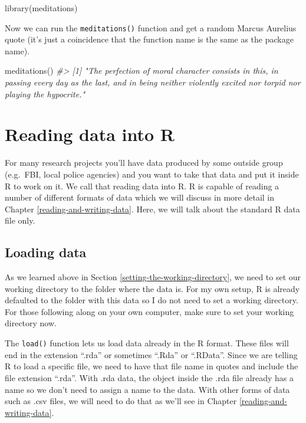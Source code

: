 \documentclass[
]{krantz}
\makeatletter
\newenvironment{Shaded}{\begin{snugshade}}{\end{snugshade}}
\newcommand{\CommentTok}[1]{\textcolor[rgb]{0.37,0.37,0.37}{\textit{#1}}}
\newcommand{\FunctionTok}[1]{\textcolor[rgb]{0,0,0}{#1}}
\newcommand{\NormalTok}[1]{#1}
\newenvironment{kframe}{%
\medskip{}
\setlength{\fboxsep}{.8em}
 \def\at@end@of@kframe{}%
 \ifinner\ifhmode%
  \def\at@end@of@kframe{\end{minipage}}%
  \begin{minipage}{\columnwidth}%
 \fi\fi%
 \def\FrameCommand##1{\hskip\@totalleftmargin \hskip-\fboxsep
 \colorbox{shadecolor}{##1}\hskip-\fboxsep
     \hskip-\linewidth \hskip-\@totalleftmargin \hskip\columnwidth}%
 \MakeFramed {\advance\hsize-\width
   \@totalleftmargin\z@ \linewidth\hsize
   \@setminipage}}%
 {\par\unskip\endMakeFramed%
 \at@end@of@kframe}
\renewenvironment{Shaded}{\begin{kframe}}{\end{kframe}}
\makeatother
\begin{document}
\begin{Shaded}
\begin{Highlighting}[]
\FunctionTok{library}\NormalTok{(meditations)}
\end{Highlighting}
\end{Shaded}

Now we can run the \texttt{meditations()} function and get a random Marcus Aurelius quote (it's just a coincidence that the function name is the same as the package name).

\begin{Shaded}
\begin{Highlighting}[]
\FunctionTok{meditations}\NormalTok{()}
\CommentTok{\#\textgreater{} [1] "The perfection of moral character consists in this, in passing every day as the last, and in being neither violently excited nor torpid nor playing the hypocrite."}
\end{Highlighting}
\end{Shaded}

\hypertarget{reading-data-into-r}{%
\section{Reading data into R}\label{reading-data-into-r}}

For many research projects you'll have data produced by some outside group (e.g.~FBI, local police agencies) and you want to take that data and put it inside R to work on it. We call that reading data into R. R is capable of reading a number of different formats of data which we will discuss in more detail in Chapter \ref{reading-and-writing-data}. Here, we will talk about the standard R data file only.

\hypertarget{loading-data-intro}{%
\subsection{Loading data}\label{loading-data-intro}}

As we learned above in Section \ref{setting-the-working-directory}, we need to set our working directory to the folder where the data is. For my own setup, R is already defaulted to the folder with this data so I do not need to set a working directory. For those following along on your own computer, make sure to set your working directory now.

The \texttt{load()} function lets us load data already in the R format. These files will end in the extension ``.rda'' or sometimes ``.Rda'' or ``.RData''. Since we are telling R to load a specific file, we need to have that file name in quotes and include the file extension ``.rda''. With .rda data, the object inside the .rda file already has a name so we don't need to assign a name to the data. With other forms of data such as .csv files, we will need to do that as we'll see in Chapter \ref{reading-and-writing-data}.
\end{document}
